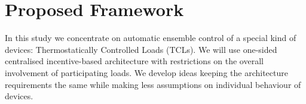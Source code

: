 \chapter{Proposed Framework}
In this study we concentrate on automatic ensemble control of a special kind of devices: Thermostatically Controlled Loads (TCLs). We will use one-sided centralised incentive-based architecture with restrictions on the overall involvement of participating loads. We develop \cite{Chertkov2017} ideas keeping the architecture requirements the same while making less assumptions on individual behaviour of devices. 







 
